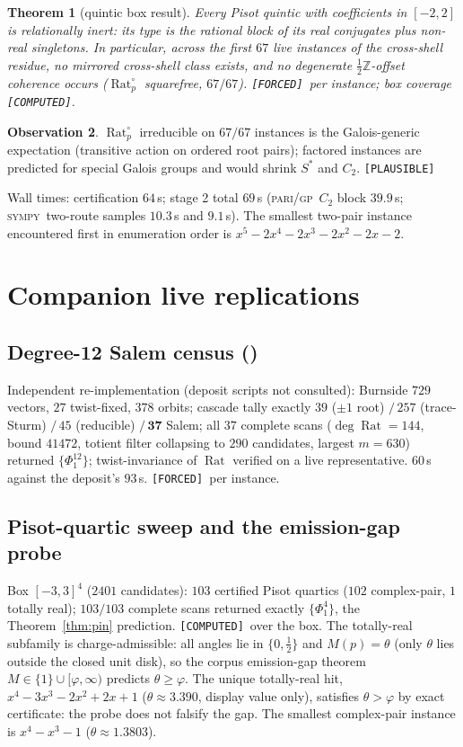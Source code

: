 \documentclass[11pt]{article}
\newcommand{\F}{\textnormal{\texttt{[FORCED]}}}
\newcommand{\C}{\textnormal{\texttt{[COMPUTED]}}}
\newcommand{\Pl}{\textnormal{\texttt{[PLAUSIBLE]}}}
\newcommand{\Z}{\mathbb{Z}}
\newcommand{\Rat}{\operatorname{Rat}}
\newcommand{\gp}{\textsc{pari/gp}}
\newcommand{\sy}{\textsc{sympy}}
\newtheorem{theorem}{Theorem}[section]
\theoremstyle{definition}
\newtheorem{observation}[theorem]{Observation}
\begin{document}
\begin{theorem}[quintic box result]\label{thm:box}
Every Pisot quintic with coefficients in $[-2,2]$ is relationally inert: its
type is the rational block of its real conjugates plus non-real singletons. In
particular, across the first $67$ live instances of the cross-shell residue,
\emph{no mirrored cross-shell class exists}, and no degenerate
$\tfrac12\Z$-offset coherence occurs ($\Rat_p^{\circ}$ squarefree, $67/67$).
\F\ per instance; box coverage \C.
\end{theorem}

\begin{observation}\label{obs:generic}
$\Rat_p^{\circ}$ irreducible on $67/67$ instances is the Galois-generic
expectation (transitive action on ordered root pairs); factored instances are
predicted for special Galois groups and would shrink $S^{*}$ and $C_2$. \Pl
\end{observation}

Wall times: certification $64$\,s; stage 2 total $69$\,s (\gp\ $C_2$ block
$39.9$\,s; \sy\ two-route samples $10.3$\,s and $9.1$\,s). The smallest two-pair
instance encountered first in enumeration order is
$x^5-2x^4-2x^3-2x^2-2x-2$.

\section{Companion live replications}\label{sec:companions}

\subsection{Degree-12 Salem census (\cite[Thm.~7.10]{relcharge})}
Independent re-implementation (deposit scripts not consulted): Burnside
$729$ vectors, $27$ twist-fixed, $378$ orbits; cascade tally exactly
$39$ ($\pm1$ root) $/\,257$ (trace-Sturm) $/\,45$ (reducible) $/\,\mathbf{37}$
Salem; all $37$ complete scans ($\deg\Rat=144$, bound $41472$, totient filter
collapsing to $290$ candidates, largest $m=630$) returned $\{\Phi_1^{12}\}$;
twist-invariance of $\Rat$ verified on a live representative. $60$\,s against
the deposit's $93$\,s. \F\ per instance.

\subsection{Pisot-quartic sweep and the emission-gap probe}
Box $[-3,3]^4$ ($2401$ candidates): $103$ certified Pisot quartics
($102$ complex-pair, $1$ totally real); $103/103$ complete scans returned
exactly $\{\Phi_1^4\}$, the Theorem~\ref{thm:pin} prediction. \C\ over the box.
The totally-real subfamily is charge-admissible: all angles lie in
$\{0,\tfrac12\}$ and $M(p)=\theta$ (only $\theta$ lies outside the closed unit
disk), so the corpus emission-gap theorem
$M\in\{1\}\cup[\varphi,\infty)$ predicts $\theta\ge\varphi$. The unique
totally-real hit, $x^4-3x^3-2x^2+2x+1$ ($\theta\approx3.390$, display value
only), satisfies $\theta>\varphi$ by exact certificate: the probe does not
falsify the gap. The smallest complex-pair instance is $x^4-x^3-1$
($\theta\approx1.3803$).
\end{document}
